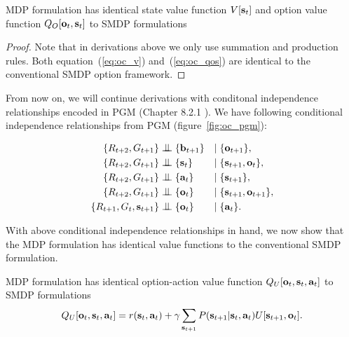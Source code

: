 \begin{prop}
  \label{prop:oc_q_soa}
  MDP formulation has identical state value function $V[{\mathbf{s}}_t]$
  and option value function $Q_O[{\mathbf{o}}_t,{\mathbf{s}}_t]$ to SMDP
  formulations
\end{prop}

\begin{proof}
  Note that in derivations above we only use summation and
  production rules. Both equation~(\ref{eq:oc_v})
  and~(\ref{eq:oc_qos}) are identical to the conventional SMDP
  option framework.
\end{proof}

From now on, we will continue derivations with conditonal
independence relationships encoded in PGM (Chapter 8.2.1
\cite{bishop2006pattern}). We have following conditional
independence relationships from PGM (figure~\ref{fig:oc_pgm}):

\begin{align}
\label{eq:c1}  \{R_{t+2},G_{t+1}\}&\bigCI \{\rvb_{t+1}\} &|\;&\{\rvo_{t+1}\},\\
\label{eq:c2} \{R_{t+2},G_{t+1}\}&\bigCI \{\rvs_t\} &|\;&\{\rvs_{t+1},\rvo_t\},\\
\label{eq:c3}  \{R_{t+2},G_{t+1}\}&\bigCI \{\rva_t\} &|\;&\{\rvs_{t+1}\},\\
\label{eq:c4}  \{R_{t+2},G_{t+1}\}&\bigCI \{\rvo_t\} &|\;&\{\rvs_{t+1},\rvo_{t+1}\},\\
\label{eq:c5}  \{R_{t+1},G_{t},\rvs_{t+1}\}&\bigCI \{\rvo_t\} &|\;&\{\rva_{t}\}.
\end{align}

With above conditional independence relationships in hand, we now
show that the MDP formulation has identical value functions to
the conventional SMDP
formulation\cite{sutton1999between,bacon2017option}.

\begin{prop}
  \label{prop:oc_q_soa}
  MDP formulation has identical option-action value function
  $Q_U[{\mathbf{o}}_t, {\mathbf{s}}_t,{\mathbf{a}}_t]$ to SMDP formulations
\begin{equation}
  \label{eq:oc_q_soa}
  Q_U[{\mathbf{o}}_t, {\mathbf{s}}_t,{\mathbf{a}}_t]=r({\mathbf{s}}_t,{\mathbf{a}}_t)+\gamma\sum_{{\mathbf{s}}_{t+1}}P({\mathbf{s}}_{t+1}|{\mathbf{s}}_t,{\mathbf{a}}_t)U[{\mathbf{s}}_{t+1},{\mathbf{o}}_t].
\end{equation}
\end{prop}

